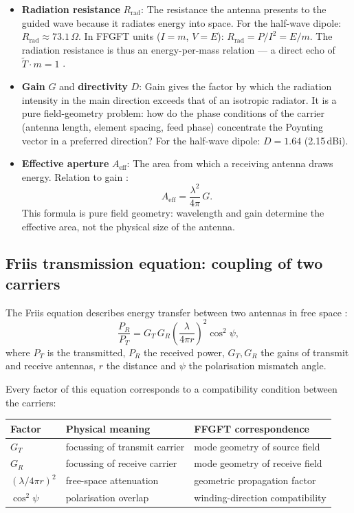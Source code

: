 \begin{itemize}[nosep]
\item \textbf{Radiation resistance} $R_\mathrm{rad}$: The resistance the
  antenna presents to the guided wave because it radiates energy into space.
  For the half-wave dipole: $R_\mathrm{rad} \approx 73.1\,\Omega$.
  In FFGFT units ($I=m$, $V=E$): $R_\mathrm{rad} = P/I^2 = E/m$.
  The radiation resistance is thus an energy-per-mass relation --- a direct
  echo of $\tilde{T}\cdot m=1$ \SM.

\item \textbf{Gain} $G$ and \textbf{directivity} $D$: Gain gives the factor
  by which the radiation intensity in the main direction exceeds that of an
  isotropic radiator. It is a pure field-geometry problem: how do the phase
  conditions of the carrier (antenna length, element spacing, feed phase)
  concentrate the Poynting vector in a preferred direction? For the half-wave
  dipole: $D = 1.64$ (2.15\,dBi).

\item \textbf{Effective aperture} $A_\mathrm{eff}$: The area from which a
  receiving antenna draws energy. Relation to gain \EM:
  \[
    A_\mathrm{eff} = \frac{\lambda^2}{4\pi}\,G.
  \]
  This formula is pure field geometry: wavelength and gain determine the
  effective area, not the physical size of the antenna.
\end{itemize}

\subsection*{Friis transmission equation: coupling of two carriers}

The Friis equation describes energy transfer between two antennas in free
space \cite{Friis1946,Balanis2016}:
\[
  \frac{P_R}{P_T} = G_T\,G_R\left(\frac{\lambda}{4\pi r}\right)^2
  \cos^2\psi,
\]
where $P_T$ is the transmitted, $P_R$ the received power, $G_T, G_R$ the
gains of transmit and receive antennas, $r$ the distance and $\psi$ the
polarisation mismatch angle.

Every factor of this equation corresponds to a compatibility condition
between the carriers:

\begin{center}
\begin{tabular}{@{}lll@{}}
\toprule
\textbf{Factor} & \textbf{Physical meaning} & \textbf{FFGFT correspondence} \\
\midrule
$G_T$ & focussing of transmit carrier & mode geometry of source field \\
$G_R$ & focussing of receive carrier & mode geometry of receive field \\
$(\lambda/4\pi r)^2$ & free-space attenuation & geometric propagation factor \\
$\cos^2\psi$ & polarisation overlap & winding-direction compatibility \\
\bottomrule
\end{tabular}
\end{center}

